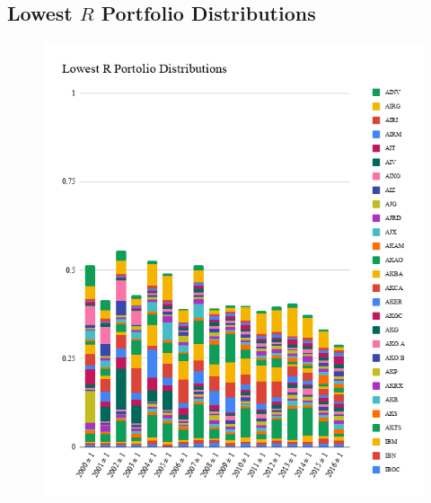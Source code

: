 \documentclass[11pt]{article}
\begin{document}
\subsection{Lowest \(R\) Portfolio Distributions}\label{apd:LowestRPortolioDistributions}
    \begin{figure}[H]
        \includegraphics[width=\textwidth]{LowestRPortolioDistributions}
    \end{figure}
\end{document}
